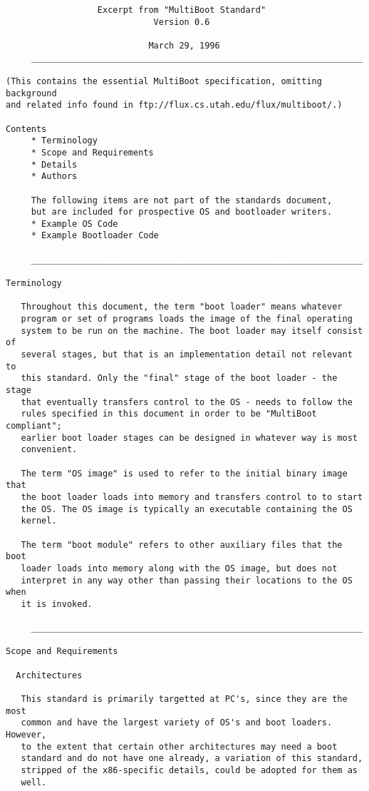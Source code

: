 \begin{verbatim}
                  Excerpt from "MultiBoot Standard"
                             Version 0.6

                            March 29, 1996
     _________________________________________________________________
                                      
(This contains the essential MultiBoot specification, omitting background
and related info found in ftp://flux.cs.utah.edu/flux/multiboot/.)

Contents
     * Terminology
     * Scope and Requirements
     * Details
     * Authors

     The following items are not part of the standards document,
     but are included for prospective OS and bootloader writers.
     * Example OS Code
     * Example Bootloader Code
       
     _________________________________________________________________
                                      
Terminology

   Throughout this document, the term "boot loader" means whatever
   program or set of programs loads the image of the final operating
   system to be run on the machine. The boot loader may itself consist of
   several stages, but that is an implementation detail not relevant to
   this standard. Only the "final" stage of the boot loader - the stage
   that eventually transfers control to the OS - needs to follow the
   rules specified in this document in order to be "MultiBoot compliant";
   earlier boot loader stages can be designed in whatever way is most
   convenient.
   
   The term "OS image" is used to refer to the initial binary image that
   the boot loader loads into memory and transfers control to to start
   the OS. The OS image is typically an executable containing the OS
   kernel.
   
   The term "boot module" refers to other auxiliary files that the boot
   loader loads into memory along with the OS image, but does not
   interpret in any way other than passing their locations to the OS when
   it is invoked.
   
     _________________________________________________________________
                                      
Scope and Requirements

  Architectures
  
   This standard is primarily targetted at PC's, since they are the most
   common and have the largest variety of OS's and boot loaders. However,
   to the extent that certain other architectures may need a boot
   standard and do not have one already, a variation of this standard,
   stripped of the x86-specific details, could be adopted for them as
   well.
   

\end{verbatim}

